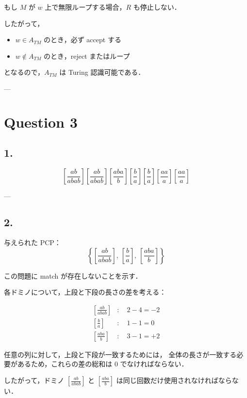 \documentclass[uplatex,a4paper,11pt]{jsarticle}
\begin{document}
もし $M$ が $w$ 上で無限ループする場合，$R$ も停止しない．

したがって，
\begin{itemize}
    \item $w \in A_{TM}$ のとき，必ず accept する
    \item $w \notin A_{TM}$ のとき，reject またはループ
\end{itemize}

となるので，$A_{TM}$ は Turing 認識可能である．

---

\section*{Question 3}

\subsection*{1.}

\[
\left[
\frac{ab}{abab}
\right]
\left[
\frac{ab}{abab}
\right]
\left[
\frac{aba}{b}
\right]
\left[
\frac{b}{a}
\right]
\left[
\frac{b}{a}
\right]
\left[
\frac{aa}{a}
\right]
\left[
\frac{aa}{a}
\right]
\]

---

\subsection*{2.}

与えられた PCP：
\[
\left\{
\left[\frac{ab}{abab}\right],\ 
\left[\frac{b}{a}\right],\ 
\left[\frac{aba}{b}\right]
\right\}
\]

この問題に match が存在しないことを示す．

各ドミノについて，上段と下段の長さの差を考える：

\[
\begin{aligned}
\left[\frac{ab}{abab}\right] &: \quad 2 - 4 = -2 \\
\left[\frac{b}{a}\right] &: \quad 1 - 1 = 0 \\
\left[\frac{aba}{b}\right] &: \quad 3 - 1 = +2
\end{aligned}
\]

任意の列に対して，上段と下段が一致するためには，
全体の長さが一致する必要があるため，これらの差の総和は 0 でなければならない．

したがって，ドミノ $\left[\frac{ab}{abab}\right]$ と $\left[\frac{aba}{b}\right]$ は同じ回数だけ使用されなければならない．
\end{document}

